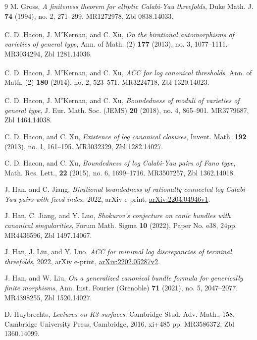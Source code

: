 \documentclass[11pt]{ip-journal}
\theoremstyle{definition}
\begin{document}
\begin{thebibliography}{9}
M. Gross, 
\emph{A finiteness theorem for elliptic {C}alabi-{Y}au threefolds},
Duke Math. J.
\textbf{74}
(1994),
no. 2,
271--299.
MR1272978,
Zbl 0838.14033.

C. D. Hacon,  
J. M\textsuperscript{c}Kernan, 
and 
C. Xu,
\emph{On the birational automorphisms of varieties of general type},
Ann. of Math. (2)
\textbf{177}
(2013),
no. 3,
1077--1111.
MR3034294,
Zbl 1281.14036.

C. D. Hacon,  
J. M\textsuperscript{c}Kernan, 
and 
C. Xu,
\emph{A{CC} for log canonical thresholds},
Ann. of Math. (2)
\textbf{180}
(2014),
no. 2,
523--571.
MR3224718,
Zbl 1320.14023.

C. D. Hacon,  
J. M\textsuperscript{c}Kernan, 
and 
C. Xu,
\emph{Boundedness of moduli of varieties of general type},
J. Eur. Math. Soc. (JEMS)
\textbf{20}
(2018),
no. 4,
865--901.
MR3779687,
Zbl 1464.14038.

C. D. Hacon,  
and 
C. Xu,
\emph{Existence of log canonical closures},
Invent. Math.
\textbf{192}
(2013),
no. 1,
161--195.
MR3032329,
Zbl 1282.14027.

C. D. Hacon,  
and 
C. Xu,
\emph{Boundedness of log {C}alabi-{Y}au pairs of {F}ano type},
Math. Res. Lett.,
\textbf{22}
(2015),
no. 6,
1699--1716.
MR3507257,
Zbl 1362.14018.

J. Han, and C. Jiang,
\emph{Birational boundedness of rationally connected log {C}alabi--{Y}au pairs with fixed index}, 
2022,
arXiv e-print, \href{https://arxiv.org/abs/2204.04946}{arXiv:2204.04946v1}.

J. Han, 
C. Jiang,  
and 
Y. Luo,
\emph{Shokurov's conjecture on conic bundles with canonical singularities},
Forum Math. Sigma
\textbf{10}
(2022),
Paper No. e38, 24pp.
MR4436596,
Zbl 1497.14067.

J. Han, 
J. Liu,  
and 
Y. Luo,
\emph{ACC for minimal log discrepancies of terminal threefolds},
2022, 
arXiv e-print, 
\href{https://arxiv.org/abs/2202.05287}{arXiv:2202.05287v2}.

J. Han,
and
W. Liu, 
\emph{On a generalized canonical bundle formula for generically finite morphisms},
Ann. Inst. Fourier (Grenoble)
\textbf{71}
(2021),
no. 5,
2047--2077.
MR4398255,
Zbl 	1520.14027.

D. Huybrechts, 
\emph{Lectures on {K}3 surfaces},
Cambridge Stud. Adv. Math., 158, 
Cambridge University Press, Cambridge, 2016. 
xi+485 pp.
MR3586372,
Zbl 1360.14099.


\end{thebibliography}
\end{document}
